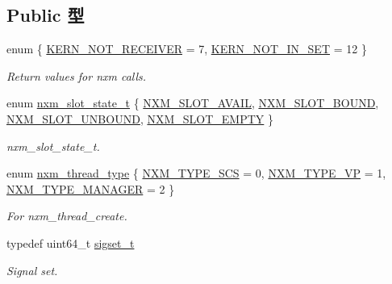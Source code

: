\subsection*{Public 型}
\begin{DoxyCompactItemize}
\item 
enum \{ \hyperlink{classTru64_a68c01102755fc7d1c810bb0b0635fa90a7fff089a9b1eae0e9e60e82d7ab27b03}{KERN\_\-NOT\_\-RECEIVER} =  7, 
\hyperlink{classTru64_a68c01102755fc7d1c810bb0b0635fa90ae5ac70379d7d014f8f37ba0ee504f35c}{KERN\_\-NOT\_\-IN\_\-SET} =  12
 \}
\begin{DoxyCompactList}\small\item\em Return values for nxm calls. \item\end{DoxyCompactList}\item 
enum \hyperlink{classTru64_a8fb8339baae435616a985ef0d3fa6af1}{nxm\_\-slot\_\-state\_\-t} \{ \hyperlink{classTru64_a8fb8339baae435616a985ef0d3fa6af1a50b7d030b516364e6a36300e54aedf42}{NXM\_\-SLOT\_\-AVAIL}, 
\hyperlink{classTru64_a8fb8339baae435616a985ef0d3fa6af1ac7fa50c98e9a7cf0683966b0d6a6104e}{NXM\_\-SLOT\_\-BOUND}, 
\hyperlink{classTru64_a8fb8339baae435616a985ef0d3fa6af1af2d76554995e1f7f2990e8deb0e444e5}{NXM\_\-SLOT\_\-UNBOUND}, 
\hyperlink{classTru64_a8fb8339baae435616a985ef0d3fa6af1aa29b88969e5bd1d58b5a3340c872c8ad}{NXM\_\-SLOT\_\-EMPTY}
 \}
\begin{DoxyCompactList}\small\item\em nxm\_\-slot\_\-state\_\-t. \item\end{DoxyCompactList}\item 
enum \hyperlink{classTru64_a047f3ab687492e1d75f613e182664384}{nxm\_\-thread\_\-type} \{ \hyperlink{classTru64_a047f3ab687492e1d75f613e182664384a3ac97f98b04f22186a86480ad5fa471d}{NXM\_\-TYPE\_\-SCS} =  0, 
\hyperlink{classTru64_a047f3ab687492e1d75f613e182664384a1d6a136a94a41d702244a74edccdb312}{NXM\_\-TYPE\_\-VP} =  1, 
\hyperlink{classTru64_a047f3ab687492e1d75f613e182664384a94b977628442e840a44dd81fdeb105ae}{NXM\_\-TYPE\_\-MANAGER} =  2
 \}
\begin{DoxyCompactList}\small\item\em For nxm\_\-thread\_\-create. \item\end{DoxyCompactList}\item 
typedef uint64\_\-t \hyperlink{classTru64_ae770e87ab143e8ad7feaf75b78a89718}{sigset\_\-t}
\begin{DoxyCompactList}\small\item\em Signal set. \item\end{DoxyCompactList}\end{DoxyCompactItemize}

